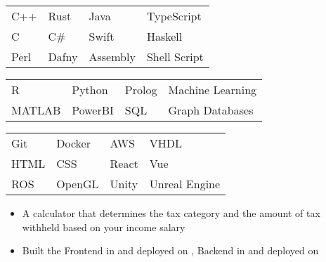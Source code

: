 \documentclass[paper=a4,fontsize=9pt]{resume}
\begin{document}
{	
		\begin{tabular}{llll}
			C++ & Rust & Java & TypeScript \\
			C & C\# & Swift & Haskell \\
			Perl & Dafny & Assembly & Shell Script
		\end{tabular}

		\medskip\normalsize

		\begin{tabular}{llll}
			R & Python & Prolog & Machine Learning \\
			MATLAB & PowerBI & SQL & Graph Databases
		\end{tabular}

		\medskip\normalsize

		\begin{tabular}{llll}
			Git & Docker & AWS & VHDL \\
			HTML & CSS & React & Vue \\
			ROS & OpenGL & Unity & Unreal Engine \\
		\end{tabular}

		\begin{itemize}
			\item A calculator that determines the tax category and the amount of tax withheld based on your income salary
			\item Built the Frontend in  and deployed on , Backend in  and deployed on 
		\end{itemize}
		\divider
}
\end{document}
